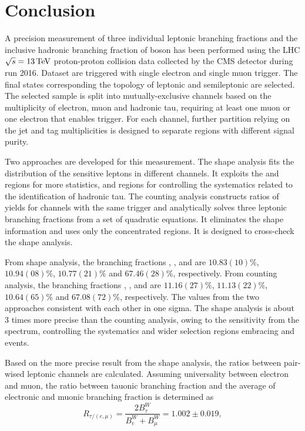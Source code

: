 \chapter{Conclusion}
\label{sec:conclusion}


A precision measurement of three individual leptonic branching fractions and the inclusive hadronic branching fraction of \PW boson has been performed using the LHC $\sqrt{s}=13\,\text{Te\hspace{-.08em}V}$ proton-proton collision data collected by the CMS detector during run 2016. Dataset are triggered with single electron and single muon trigger. The final states corresponding the topology of leptonic and semileptonic \ttbar are selected. The selected sample is split into mutually-exclusive channels based on the multiplicity of electron, muon and hadronic tau, requiring at least one muon or one electron that enables trigger. For each channel, further partition relying on the jet and \PQb tag multiplicities is designed to separate regions with different signal purity.

Two approaches are developed for this measurement. The shape analysis fits the \pt distribution of the sensitive leptons in different channels. It exploits the \WW and \wjets regions for more \PW statistics, and \zjets regions for controlling the systematics related to the identification of hadronic tau. The counting analysis constructs ratios of yields for channels with the same trigger and analytically solves three leptonic branching fractions from a set of quadratic equations. It eliminates the shape information and uses only the \ttbar concentrated regions. It is designed to cross-check the shape analysis. 


From shape analysis, the \PW branching fractions \BWe, \BWm, \BWt and \BWh are $10.83(10)\%$, $10.94(08)\%$, $10.77(21)\%$ and $67.46(28)\%$, respectively. From counting analysis, the \PW branching fractions \BWe, \BWm, \BWt and \BWh are $11.16(27)\%$, $11.13(22)\%$, $10.64(65)\%$ and $67.08(72)\%$, respectively. The values from the two approaches consistent with each other in one sigma. The shape analysis is about 3 times more precise than the counting analysis, owing to the sensitivity from the \pt spectrum, controlling the \PGth systematics and wider selection regions embracing \WW and \wjets events. 

Based on the more precise result from the shape analysis, the ratios between pair-wised leptonic channels are calculated. Assuming universality between electron and muon, the ratio between tauonic branching fraction and the average of electronic and muonic branching fraction is determined as
\begin{equation*}
    R_{\tau/(e,\mu)} = \frac{2 B^W_\tau} {B^W_e +  B^W_\mu} = 1.002\pm0.019,
\end{equation*}

